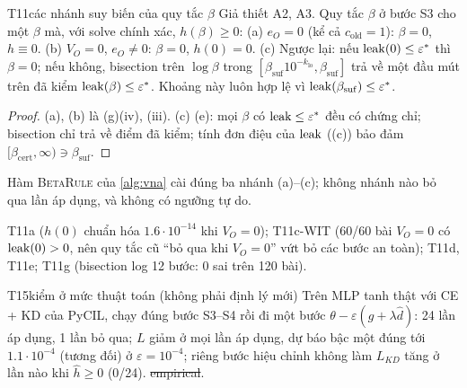 \begin{namedthm}{T11}{các nhánh suy biến của quy tắc $\beta$}
Giả thiết A2, A3. Quy tắc $\beta$ ở bước S3 cho một $\beta$ mà, với solve chính xác, $h(\beta)\ge0$:
(a) $e_O=0$ (kể cả $c_{\mathrm{old}}=1$): $\beta=0$, $h\equiv0$.
(b) $V_O=0$, $e_O\ne0$: $\beta=0$, $h(0)=0$.
(c) Ngược lại: nếu $\operatorname{leak}(0)\le\varepsilon^*$ thì $\beta=0$; nếu không, bisection trên $\log\beta$ trong $[\beta_{\mathrm{suf}}10^{-k_{\mathrm{lo}}},\beta_{\mathrm{suf}}]$ trả về một đầu mút trên đã kiểm $\operatorname{leak}(\beta)\le\varepsilon^*$. Khoảng này luôn hợp lệ vì $\operatorname{leak}(\beta_{\mathrm{suf}})\le\varepsilon^*$.
\end{namedthm}
\begin{proof}
(a), (b) là (g)(iv), (iii). (c) (e): mọi $\beta$ có $\operatorname{leak}\le\varepsilon^*$ đều có chứng chỉ; bisection chỉ trả về điểm đã kiểm; tính đơn điệu của $\operatorname{leak}$ ((c)) bảo đảm $[\beta_{\mathrm{cert}},\infty)\ni\beta_{\mathrm{suf}}$.
\end{proof}
\begin{hequa}
Hàm \textsc{BetaRule} của \cref{alg:vna} cài đúng ba nhánh (a)--(c); không nhánh nào bỏ qua lần áp dụng, và không có ngưỡng tự do.
\end{hequa}
\begin{kiem}
T11a ($h(0)$ chuẩn hóa $1.6\cdot10^{-14}$ khi $V_O=0$); T11c-WIT (60/60 bài $V_O=0$ có $\operatorname{leak}(0)>0$, nên quy tắc cũ ``bỏ qua khi $V_O=0$'' vứt bỏ các bước an toàn); T11d, T11e; T11g (bisection log 12 bước: 0 sai trên 120 bài).
\end{kiem}

\begin{namedthm}{T15}{kiểm ở mức thuật toán (không phải định lý mới)}
Trên MLP tanh thật với CE + KD của PyCIL, chạy đúng bước S3--S4 rồi đi một bước $\theta-\varepsilon(g+\lambda\hat d)$: 24 lần áp dụng, 1 lần bỏ qua; $L$ giảm ở mọi lần áp dụng, dự báo bậc một đúng tới $1.1\cdot10^{-4}$ (tương đối) ở $\varepsilon=10^{-4}$; riêng bước hiệu chỉnh không làm $L_{KD}$ tăng ở lần nào khi $\hat h\ge0$ (0/24). \st{empirical}.
\end{namedthm}
